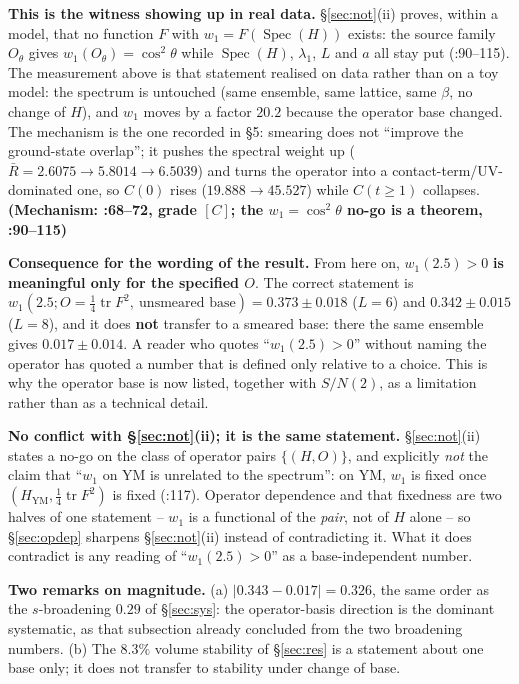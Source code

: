 \documentclass[11pt,a4paper]{article}
\newcommand{\code}[1]{\texttt{\footnotesize\detokenize{#1}}}
\newcommand{\gr}[1]{\textbf{(#1)}}
\newcommand{\nogo}{no-go}
\begin{document}
\textbf{This is the \code{u11} witness showing up in real data.} \S\ref{sec:not}(ii) proves, within a model, that no function $F$ with
$w_1=F(\operatorname{Spec}(H))$ exists: the source family $O_\theta$ gives $w_1(O_\theta)=\cos^2\theta$ while $\operatorname{Spec}(H)$, $\lambda_1$,
$L$ and $a$ all stay put (\code{U11.md}:90--115). The measurement above is that statement realised on data rather than on a toy model: the spectrum
is untouched (same ensemble, same lattice, same $\beta$, no change of $H$), and $w_1$ moves by a factor $20.2$ because the operator base changed.
The mechanism is the one recorded in \code{RUN3.md} \S5: smearing does not ``improve the ground-state overlap''; it pushes the spectral weight up
($\bar R=2.6075\to5.8014\to6.5039$) and turns the operator into a contact-term/UV-dominated one, so $C(0)$ rises ($19.888\to45.527$) while
$C(t\ge1)$ collapses. \gr{Mechanism: \code{RUN3.md}:68--72, grade $[C]$; the $w_1=\cos^2\theta$ no-go is a theorem, \code{U11.md}:90--115}

\textbf{Consequence for the wording of the result.} From here on, $w_1(2.5)>0$ \textbf{is meaningful only for the specified $O$}. The correct
statement is $w_1(2.5;O=\tfrac14\operatorname{tr}F^2,\ \text{unsmeared base})=0.373\pm0.018$ ($L=6$) and $0.342\pm0.015$ ($L=8$), and it does
\textbf{not} transfer to a smeared base: there the same ensemble gives $0.017\pm0.014$. A reader who quotes ``$w_1(2.5)>0$'' without naming the
operator has quoted a number that is defined only relative to a choice. This is why the operator base is now listed, together with $S/N(2)$, as a
limitation rather than as a technical detail.

\textbf{No conflict with \S\ref{sec:not}(ii); it is the same statement.} \S\ref{sec:not}(ii) states a \nogo{} on the class of operator pairs
$\{(H,O)\}$, and explicitly \emph{not} the claim that ``$w_1$ on YM is unrelated to the spectrum'': on YM, $w_1$ is fixed once
$(H_{\mathrm{YM}},\tfrac14\operatorname{tr}F^2)$ is fixed (\code{U11.md}:117). Operator dependence and that fixedness are two halves of one
statement -- $w_1$ is a functional of the \emph{pair}, not of $H$ alone -- so \S\ref{sec:opdep} sharpens \S\ref{sec:not}(ii) instead of
contradicting it. What it does contradict is any reading of ``$w_1(2.5)>0$'' as a base-independent number.

\textbf{Two remarks on magnitude.} (a) $|0.343-0.017|=0.326$, the same order as the $s$-broadening $0.29$ of \S\ref{sec:sys}: the operator-basis
direction is the dominant systematic, as that subsection already concluded from the two broadening numbers. (b) The $8.3\%$ volume stability of
\S\ref{sec:res} is a statement about one base only; it does not transfer to stability under change of base.
\end{document}
